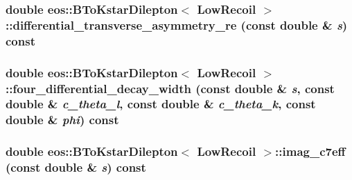 \label{classeos_1_1BToKstarDilepton_3_01LowRecoil_01_4_a85022b9ced2ab3c8f875043257818731}
\hypertarget{classeos_1_1BToKstarDilepton_3_01LowRecoil_01_4_adae1d33fab547d33c5dbd9b218cd3d56}{
\subsubsection[{differential\_\-transverse\_\-asymmetry\_\-re}]{\setlength{\rightskip}{0pt plus 5cm}double eos::BToKstarDilepton$<$ {\bf LowRecoil} $>$::differential\_\-transverse\_\-asymmetry\_\-re (const double \& {\em s}) const}}
\label{classeos_1_1BToKstarDilepton_3_01LowRecoil_01_4_adae1d33fab547d33c5dbd9b218cd3d56}
\hypertarget{classeos_1_1BToKstarDilepton_3_01LowRecoil_01_4_a7e9d0b8473b5b1bcf0bad5b9454dde4a}{
\subsubsection[{four\_\-differential\_\-decay\_\-width}]{\setlength{\rightskip}{0pt plus 5cm}double eos::BToKstarDilepton$<$ {\bf LowRecoil} $>$::four\_\-differential\_\-decay\_\-width (const double \& {\em s}, \/  const double \& {\em c\_\-theta\_\-l}, \/  const double \& {\em c\_\-theta\_\-k}, \/  const double \& {\em phi}) const}}
\label{classeos_1_1BToKstarDilepton_3_01LowRecoil_01_4_a7e9d0b8473b5b1bcf0bad5b9454dde4a}
\hypertarget{classeos_1_1BToKstarDilepton_3_01LowRecoil_01_4_a40fabc015bec286925c5d83a06ac35b5}{
\subsubsection[{imag\_\-c7eff}]{\setlength{\rightskip}{0pt plus 5cm}double eos::BToKstarDilepton$<$ {\bf LowRecoil} $>$::imag\_\-c7eff (const double \& {\em s}) const}}

